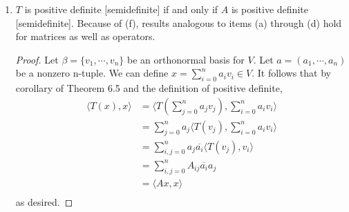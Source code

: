 \documentclass[11pt]{scrartcl}
\begin{document}
\begin{enumerate}[label=\alph*.]
{\begin{proof}
		      Since $T$ and $U$ are positive definite operators, $TU$ is self adjoint because $$(TU)^* = U^*T^* = UT = TU$$
				 Let $Q^2 = T$ such that $Q$ is positive definite. We know that $Q^2U = QQU = QUQ$ because of part (d).
				 \begin{align*}
					\langle TU(x),x \rangle & = \langle Q^2U(x),x \rangle \\
					& = \langle QUQ(x),x \rangle\\
					& = \langle UQ(x),Q(x) \rangle\\
					& > 0
				 \end{align*} 
				 Therefore, $TU$ is positive definite.
	      \end{proof}
	      }
	\item{
	      $T$ is positive definite [semidefinite] if and only if $A$ is positive definite [semidefinite]. Because of (f), results
	      analogous to items (a) through (d) hold for matrices as well as operators.
	      \begin{proof}
		      Let $\beta = \{v_1, \cdots, v_n\}$ be an orthonormal basis for $V$.
		      Let $a = (a_1, \cdots, a_n)$ be a nonzero n-tuple. We can define $x = \sum_{i = 0}^{n} a_i v_i \in V$.
		      It follows that by corollary of Theorem 6.5 and the definition of positive definite,
		      \begin{align*}
			      \langle T(x),x \rangle & =  \langle T(\sum_{j = 0}^{n} a_j v_j),\sum_{i = 0}^{n} a_i v_i \rangle \\
			                             & = \sum_{j = 0}^{n} a_j \langle T(v_j),\sum_{i = 0}^{n} a_i v_i \rangle  \\
			                             & = \sum_{i,j = 0}^{n} a_j \overline{a_i}\langle T(v_j),v_i \rangle       \\
										 & = \sum_{i,j = 0}^{n} A_{ij} \overline{a_i} a_j                          \\
										 & = \langle Ax , x\rangle \\
		      \end{align*}
		      as desired.
	      \end{proof}
	      }
\end{enumerate}

\end{document}
